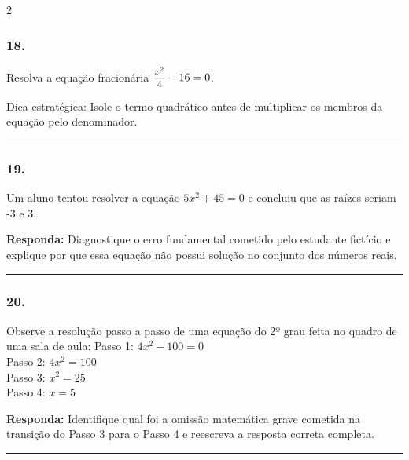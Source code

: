 \documentclass[twoside, 10pt, a4paper]{article}
\newlength{\espacoPreQuestao}\setlength{\espacoPreQuestao}{0.1cm}
\newlength{\espacoQuestao}\setlength{\espacoQuestao}{0.2cm}
\begin{document}
\begin{multicols*}{2}
\subsubsection*{18.} Resolva a equação fracionária $ \mfrac{x^2}{4} - 16 = 0 $. 
\begin{boxdica}
Dica estratégica: Isole o termo quadrático antes de multiplicar os membros da equação pelo denominador.
\end{boxdica}
\par\vspace{\espacoQuestao}

\noindent\textcolor{CorLinha}{\rule{\linewidth}{0.5pt}} 
\par\vspace{\espacoPreQuestao}
\subsubsection*{19.} Um aluno tentou resolver a equação $ 5x^2 + 45 = 0 $ e concluiu que as raízes seriam -3 e 3. 
\begin{boxresponda}
\textbf{Responda:} Diagnostique o erro fundamental cometido pelo estudante fictício e explique por que essa equação não possui solução no conjunto dos números reais.
\end{boxresponda}
\par\vspace{\espacoQuestao}

\noindent\textcolor{CorLinha}{\rule{\linewidth}{0.5pt}} 
\par\vspace{\espacoPreQuestao}
\subsubsection*{20.} Observe a resolução passo a passo de uma equação do 2º grau feita no quadro de uma sala de aula:
Passo 1: $ 4x^2 - 100 = 0 $ \\
Passo 2: $ 4x^2 = 100 $ \\
Passo 3: $ x^2 = 25 $ \\
Passo 4: $ x = 5 $
\begin{boxresponda}
\textbf{Responda:} Identifique qual foi a omissão matemática grave cometida na transição do Passo 3 para o Passo 4 e reescreva a resposta correta completa.
\end{boxresponda}
\par\vspace{\espacoQuestao}

\noindent\textcolor{CorLinha}{\rule{\linewidth}{0.5pt}} 
\par\vspace{\espacoPreQuestao}

\end{multicols*}
\end{document}
